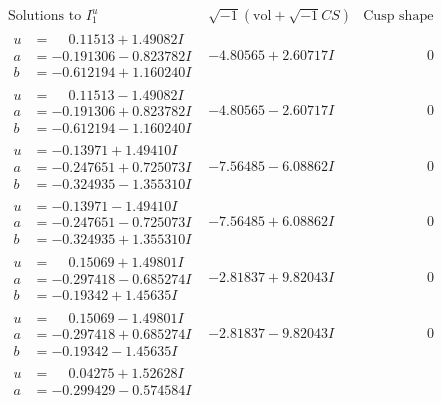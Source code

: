 \documentclass[1p]{elsarticle_modified}
\theoremstyle{definition}
\newcommand{\I}{\sqrt{-1}}
\begin{document}
$$\begin{array}{c|c|c}
\text{Solutions to }I^u_{1}& \I (\text{vol} + \sqrt{-1}CS) & \text{Cusp shape}\\
 \hline 
\begin{aligned}
u &= \phantom{-}0.11513 + 1.49082 I \\
a &= -0.191306 - 0.823782 I \\
b &= -0.612194 + 1.160240 I\end{aligned}
 & -4.80565 + 2.60717 I & \phantom{-0.000000 } 0 \\ \hline\begin{aligned}
u &= \phantom{-}0.11513 - 1.49082 I \\
a &= -0.191306 + 0.823782 I \\
b &= -0.612194 - 1.160240 I\end{aligned}
 & -4.80565 - 2.60717 I & \phantom{-0.000000 } 0 \\ \hline\begin{aligned}
u &= -0.13971 + 1.49410 I \\
a &= -0.247651 + 0.725073 I \\
b &= -0.324935 - 1.355310 I\end{aligned}
 & -7.56485 - 6.08862 I & \phantom{-0.000000 } 0 \\ \hline\begin{aligned}
u &= -0.13971 - 1.49410 I \\
a &= -0.247651 - 0.725073 I \\
b &= -0.324935 + 1.355310 I\end{aligned}
 & -7.56485 + 6.08862 I & \phantom{-0.000000 } 0 \\ \hline\begin{aligned}
u &= \phantom{-}0.15069 + 1.49801 I \\
a &= -0.297418 - 0.685274 I \\
b &= -0.19342 + 1.45635 I\end{aligned}
 & -2.81837 + 9.82043 I & \phantom{-0.000000 } 0 \\ \hline\begin{aligned}
u &= \phantom{-}0.15069 - 1.49801 I \\
a &= -0.297418 + 0.685274 I \\
b &= -0.19342 - 1.45635 I\end{aligned}
 & -2.81837 - 9.82043 I & \phantom{-0.000000 } 0 \\ \hline\begin{aligned}
u &= \phantom{-}0.04275 + 1.52628 I \\
a &= -0.299429 - 0.574584 I \\

\end{aligned}
\end{array}$$
\end{document}
